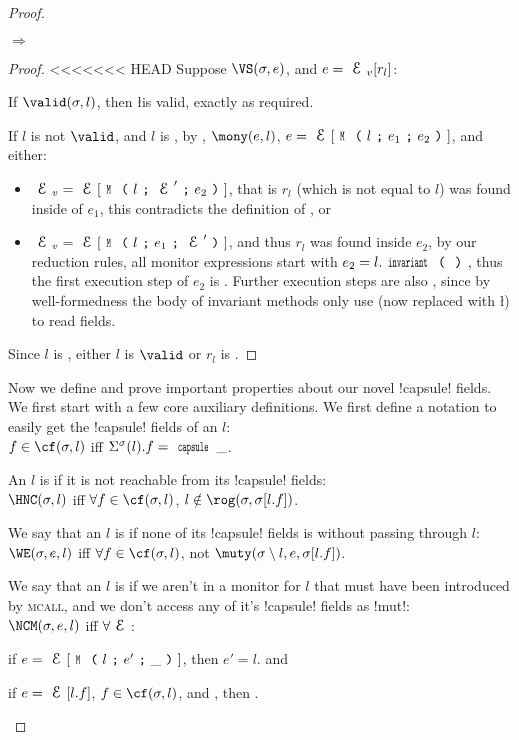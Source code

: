 \begin{Assumption}
\begin{Assumption}
\begin{Assumption}
\begin{proof}
\begin{theorem}\rm {} $\Rightarrow$ 
\end{theorem}\SS
\begin{proof}
<<<<<<< HEAD
\noindent Suppose $\VS(\s, e)$, and $e = \EV[r_l]$:
\begin{ienumerate}
	\item If $\valid(\s,l)$, then \l is valid, exactly as required.
	\item If $l$ is not $\valid$, and $l$ is \reach, by , $\mony(e,l)$, $e = \E[\M{l}{e_1}{e_2}]$, and either:
	\begin{itemize}
	 \item $\EV = \E[\M{l}{\E'}{e_2}]$, that is $r_l$ (which is not equal to $l$) was found inside of $e_1$, this contradicts the definition of \mony, or
	 \item $\EV = \E[\M{l}{e_1}{\E'}]$, and thus $r_l$ was found inside $e_2$,  by our reduction rules, all monitor expressions start with $e_2=l.\invariant$, thus the first execution step
	 of $e_2$ is \trusted. Further execution steps are also \trusted, since by well-formedness the body of invariant methods only use \Q@this@ (now replaced with \l) to read fields.
	\end{itemize}
\end{ienumerate}
Since $l$ is \reach, either $l$ is $\valid$ or $r_l$ is \trusted.
\end{proof}

Now we define and prove important properties about our novel \Q!capsule! fields. We first start with a few core auxiliary definitions. We first define a notation to easily get the \Q!capsule! fields of an $l$:\\
\indent $f \in \cf(\s, l)$ iff $\Ss(l).f = \Kw{capsule}\,\_$.

\noindent An $l$ is \HNC if it is not reachable from its \Q!capsule! fields:\\
\indent $\HNC(\s, l)$ iff $\forall f \in \cf(\s, l)$, $l \notin \rog(\s, \s[l.f])$.

\noindent We say that an $l$ is \WE if none of its \Q!capsule! fields is \muty without passing through $l$:\\
\indent $\WE(\s, e, l)$ iff $\forall f \in \cf(\s, l)$, not $\muty(\s\setminus l, e, \s[l.f])$.

\noindent We say that an $l$ is \NCM if we aren't in a monitor for $l$ that must have been introduced by \textsc{mcall}, and we don't access any of it's \Q!capsule! fields as \Q!mut!:\\
\indent $\NCM(\s, e, l)$ iff $\forall \E$:
\begin{iitemize}
\item if $e = \E[\M{l}{e'}{\_}]$, then $e' = l$. and
\item if $e = \E[l.f]$, $f \in \cf(\s, l)$, and , then .
\end{iitemize}


\end{proof}
\end{Assumption}
\end{Assumption}
\end{Assumption}
